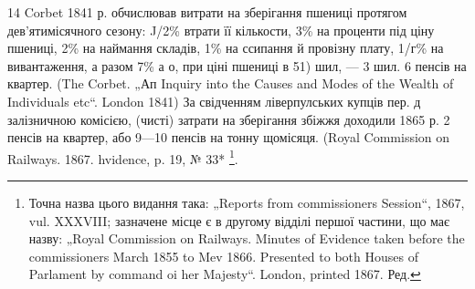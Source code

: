 14 Corbet 1841 р. обчислював витрати на зберігання пшениці протягом дев'ятимісячного
сезону: J/2\% втрати її кількости, 3\% на проценти під ціну пшениці,
2\% на наймання складів, 1\% на ссипання й провізну плату, 1/г\% на вивантаження,
а разом 7\% а о, при ціні пшениці в 51) шил, — 3 шил. 6 пенсів на
квартер. (The Corbet. „Ап Inquiry into the Causes and Modes of the Wealth of
Individuals etc“. London 1841) За свідченням ліверпулських купців пер. д залізничною
комісією, (чисті) затрати на зберігання збіжжя доходили 1865 р. 2 пенсів
на квартер, або 9—10 пенсів на тонну щомісяця. (Royal Commission on Railways.
1867. hvidence, p. 19, № 33* \footnote*{
Точна назва цього видання така: „Reports from commissioners Session“,
1867, vul. XXXVIII; зазначене місце є в другому відділі першої частини, що має
назву: „Royal Commission on Railways. Minutes of Evidence taken before the commissioners
March 1855 to Mev 1866. Presented to both Houses of Parlament by
command oi her Majesty“. London, printed 1867. Ред.
}.
\parbreak{}  %
